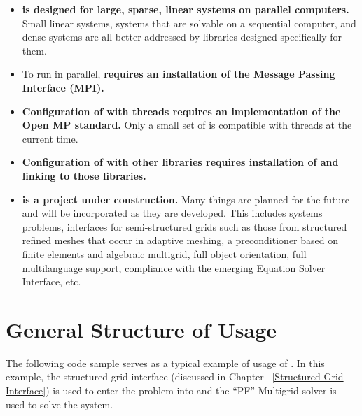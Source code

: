 \begin{itemize}

\item
{\bf \hypre{} is designed for large, sparse, linear systems on parallel
computers.}  Small linear systems, 
systems that are solvable on a sequential computer, and dense systems are all
better addressed by libraries designed specifically for them. 

\item
To run in parallel, {\bf \hypre{} requires an installation of the Message Passing Interface (MPI).}

\item
{\bf Configuration of \hypre{} with threads
requires an implementation of the Open MP standard.}
Only a small set of \hypre{} is compatible with threads at the current time.

\item
{\bf Configuration of \hypre{} with other libraries requires installation of and
linking to those libraries.}

\item
{\bf \hypre{} is a project under construction.} Many things are planned
for the future and will be incorporated as they are developed.
This includes systems problems, interfaces for semi-structured grids
such as those from structured refined meshes that occur in adaptive meshing,
a preconditioner based on finite elements and algebraic multigrid,
full object orientation, full multilanguage support, compliance
with the emerging Equation Solver Interface, etc.

\end{itemize}




\chapter{General Structure of Usage}

The following code sample serves as a typical example of usage
of \hypre{}. In this example, the structured grid interface (discussed
in Chapter
~\ref{Structured-Grid Interface}) is used to enter the problem
into \hypre{} and the ``PF'' Multigrid solver is used to solve
the system.


